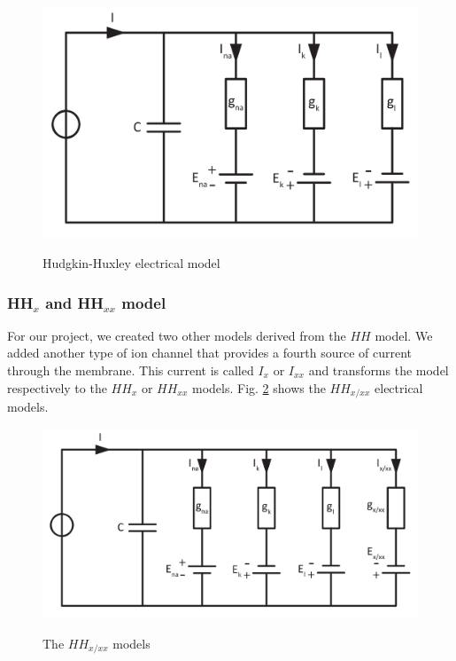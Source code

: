 \documentclass[a4paper, 10pt, conference]{ieeeconf}      %
\begin{document}
\begin{figure}
\includegraphics[width=\columnwidth]{figures/HH_model.pdf}
\label{fig:HH_model}
\caption{Hudgkin-Huxley electrical model}
\end{figure}






\subsubsection*{HH$_{x}$ and HH$_{xx}$ model}
For our project, we created two other models derived from the $HH$ model. We added another type of ion channel that provides a fourth source of current through the membrane. This current is called $I_{x}$ or $I_{xx}$ and transforms the model respectively to the $HH_{x}$ or $HH_{xx}$ models. Fig. \ref{fig:HHx_model} shows the $HH_{x/xx}$ electrical models.\\

\begin{figure}
\includegraphics[width=\columnwidth]{figures/HHx_model.pdf}
\label{fig:HHx_model}
\caption{The $HH_{x/xx}$ models}
\end{figure}
\end{document}
